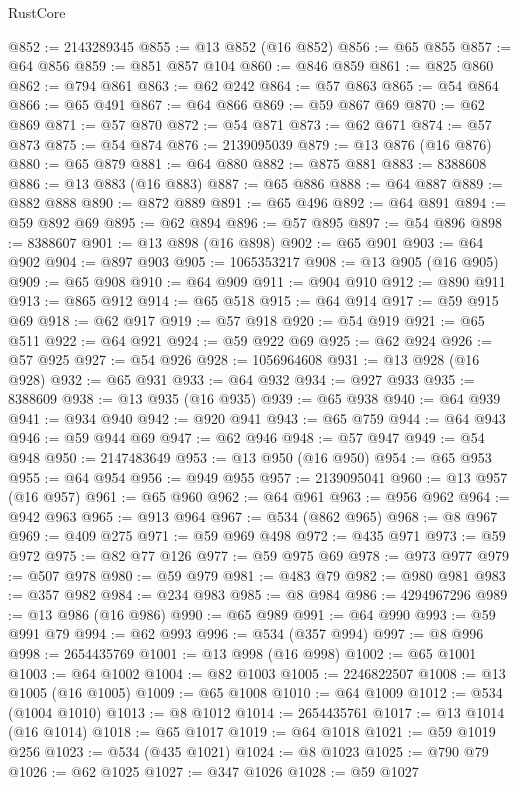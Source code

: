 \begin{lexlean}{RustCore}
\begin{coremodule}
@852 := 2143289345
@855 := @13 @852 (@16 @852)
@856 := @65 @855
@857 := @64 @856
@859 := @851 @857 @104
@860 := @846 @859
@861 := @825 @860
@862 := @794 @861
@863 := @62 @242
@864 := @57 @863
@865 := @54 @864
@866 := @65 @491
@867 := @64 @866
@869 := @59 @867 @69
@870 := @62 @869
@871 := @57 @870
@872 := @54 @871
@873 := @62 @671
@874 := @57 @873
@875 := @54 @874
@876 := 2139095039
@879 := @13 @876 (@16 @876)
@880 := @65 @879
@881 := @64 @880
@882 := @875 @881
@883 := 8388608
@886 := @13 @883 (@16 @883)
@887 := @65 @886
@888 := @64 @887
@889 := @882 @888
@890 := @872 @889
@891 := @65 @496
@892 := @64 @891
@894 := @59 @892 @69
@895 := @62 @894
@896 := @57 @895
@897 := @54 @896
@898 := 8388607
@901 := @13 @898 (@16 @898)
@902 := @65 @901
@903 := @64 @902
@904 := @897 @903
@905 := 1065353217
@908 := @13 @905 (@16 @905)
@909 := @65 @908
@910 := @64 @909
@911 := @904 @910
@912 := @890 @911
@913 := @865 @912
@914 := @65 @518
@915 := @64 @914
@917 := @59 @915 @69
@918 := @62 @917
@919 := @57 @918
@920 := @54 @919
@921 := @65 @511
@922 := @64 @921
@924 := @59 @922 @69
@925 := @62 @924
@926 := @57 @925
@927 := @54 @926
@928 := 1056964608
@931 := @13 @928 (@16 @928)
@932 := @65 @931
@933 := @64 @932
@934 := @927 @933
@935 := 8388609
@938 := @13 @935 (@16 @935)
@939 := @65 @938
@940 := @64 @939
@941 := @934 @940
@942 := @920 @941
@943 := @65 @759
@944 := @64 @943
@946 := @59 @944 @69
@947 := @62 @946
@948 := @57 @947
@949 := @54 @948
@950 := 2147483649
@953 := @13 @950 (@16 @950)
@954 := @65 @953
@955 := @64 @954
@956 := @949 @955
@957 := 2139095041
@960 := @13 @957 (@16 @957)
@961 := @65 @960
@962 := @64 @961
@963 := @956 @962
@964 := @942 @963
@965 := @913 @964
@967 := @534 (@862 @965)
@968 := @8 @967
@969 := @409 @275
@971 := @59 @969 @498
@972 := @435 @971
@973 := @59 @972
@975 := @82 @77 @126
@977 := @59 @975 @69
@978 := @973 @977
@979 := @507 @978
@980 := @59 @979
@981 := @483 @79
@982 := @980 @981
@983 := @357 @982
@984 := @234 @983
@985 := @8 @984
@986 := 4294967296
@989 := @13 @986 (@16 @986)
@990 := @65 @989
@991 := @64 @990
@993 := @59 @991 @79
@994 := @62 @993
@996 := @534 (@357 @994)
@997 := @8 @996
@998 := 2654435769
@1001 := @13 @998 (@16 @998)
@1002 := @65 @1001
@1003 := @64 @1002
@1004 := @82 @1003
@1005 := 2246822507
@1008 := @13 @1005 (@16 @1005)
@1009 := @65 @1008
@1010 := @64 @1009
@1012 := @534 (@1004 @1010)
@1013 := @8 @1012
@1014 := 2654435761
@1017 := @13 @1014 (@16 @1014)
@1018 := @65 @1017
@1019 := @64 @1018
@1021 := @59 @1019 @256
@1023 := @534 (@435 @1021)
@1024 := @8 @1023
@1025 := @790 @79
@1026 := @62 @1025
@1027 := @347 @1026
@1028 := @59 @1027

\end{coremodule}
\end{lexlean}
